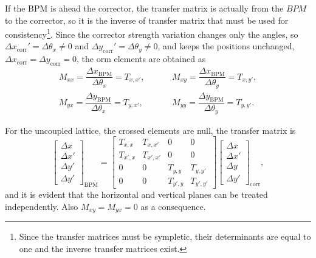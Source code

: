 If the BPM is ahead the corrector, the transfer matrix is actually from the $BPM$ to the corrector, so it is the inverse of transfer matrix that must be used for consistency\footnote{Since the transfer matrices must be sympletic, their determinants are equal to one and the inverse transfer matrices exist.}. Since the corrector strength variation changes only the angles, so $\Delta x_{\mathrm{corr}}' = \Delta \theta_x \neq 0$ and $\Delta y_{\mathrm{corr}}' = \Delta \theta_y \neq 0$, and keeps the positions unchanged, $\Delta x_{\mathrm{corr}} = \Delta y_{\mathrm{corr}} = 0$, the \gls{orm} elements are obtained as 
\begin{align*}
    M_{xx} = \dfrac{\Delta x_{\mathrm{BPM}}}{\Delta \theta_x} = T_{x, x'}, & \hspace{1cm} M_{xy} = \dfrac{\Delta x_{\mathrm{BPM}}}{\Delta \theta_y} = T_{x, y'}, \\
    M_{yx} = \dfrac{\Delta y_{\mathrm{BPM}}}{\Delta \theta_x} = T_{y, x'}, & \hspace{1cm} M_{yy} = \dfrac{\Delta y_{\mathrm{BPM}}}{\Delta \theta_y} = T_{y, y'}.
\end{align*}

For the uncoupled lattice, the crossed elements are null, the transfer matrix is
\begin{equation}
    \begin{bmatrix}
    \Delta x \\
    \Delta x' \\
    \Delta y' \\
    \Delta y'
    \end{bmatrix}_{\mathrm{BPM}}  =
    \begin{bmatrix}
    T_{x, x} & T_{x, x'} & 0 & 0  \\
    T_{x', x} & T_{x', x'} & 0 & 0 \\
    0 & 0  & T_{y, y} & T_{y, y'} \\
    0 & 0 & T_{y', y} & T_{y', y'} 
    \end{bmatrix} 
    \begin{bmatrix}
    \Delta x \\
    \Delta x' \\
    \Delta y \\
    \Delta y'
    \end{bmatrix}_{\mathrm{corr}},
\end{equation}
and it is evident that the horizontal and vertical planes can be treated independently. Also $M_{xy} = M_{yx} = 0$ as a consequence.

